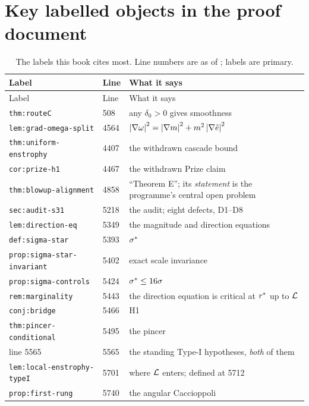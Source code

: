 \section{Key labelled objects in the proof document}
\label{sec:a3-labels}

{\footnotesize
\begin{longtable}{@{}>{\raggedright\arraybackslash}p{} l >{\raggedright\arraybackslash}p{}@{}}
\caption[Key labelled objects]{The labels this book cites most. Line numbers
are as of ; labels are primary.}
\label{tab:a3-labels}\\
\toprule
Label & Line & What it says \\
\midrule
\endfirsthead
\toprule
Label & Line & What it says \\
\midrule
\endhead
\bottomrule
\endfoot
\texttt{thm:routeC} & 508 & any \(\delta_0>0\) gives smoothness \\
\texttt{lem:grad-omega-split} & 4564 &
  \(\left|\nabla\omega\right|^2=\left|\nabla m\right|^2+m^2\left|\nabla\hat{e}\right|^2\) \\
\texttt{thm:uniform-enstrophy} & 4407 & the withdrawn cascade bound \\
\texttt{cor:prize-h1} & 4467 & the withdrawn Prize claim \\
\texttt{thm:blowup-alignment} & 4858 & ``Theorem E''; its \emph{statement} is
  the programme's central open problem \\
\texttt{sec:audit-s31} & 5218 & the audit; eight defects, D1--D8 \\
\texttt{lem:direction-eq} & 5349 & the magnitude and direction equations \\
\texttt{def:sigma-star} & 5393 & \(\sigma^{*}\) \\
\texttt{prop:sigma-star-} \texttt{invariant} & 5402 & exact scale invariance \\
\texttt{prop:sigma-controls} & 5424 & \(\sigma^{*}\le16\sigma\) \\
\texttt{rem:marginality} & 5443 & the direction equation is critical at
  \(r^{*}\) up to \(\mathcal{L}\) \\
\texttt{conj:bridge} & 5466 & H1 \\
\texttt{thm:pincer-conditional} & 5495 & the pincer \\
line 5565 & 5565 & the standing Type-I hypotheses, \emph{both} of them \\
\texttt{lem:local-enstrophy-} \texttt{typeI} & 5701 & where \(\mathcal{L}\) enters;
  defined at 5712 \\
\texttt{prop:first-rung} & 5740 & the angular Caccioppoli \\

\end{longtable}}
